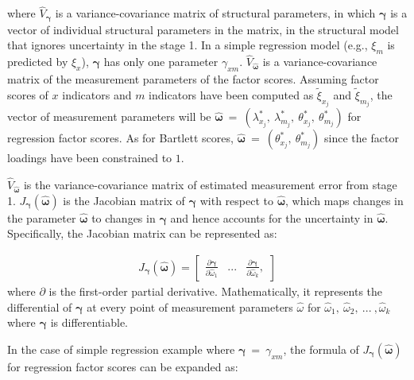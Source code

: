 \documentclass[
  11pt,
  man]{apa6}
\begin{document}
where \(\hat{V}_{\boldsymbol{\gamma}}\) is a variance-covariance matrix of structural parameters, in which \(\boldsymbol{\gamma}\) is a vector of individual structural parameters in the matrix, in the structural model that ignores uncertainty in the stage 1. In a simple regression model (e.g., \(\xi_{m}\) is predicted by \(\xi_{x}\)), \(\boldsymbol{\gamma}\) has only one parameter \(\gamma_{xm}\). \(\hat{V}_{\boldsymbol{\hat{\omega}}}\) is a variance-covariance matrix of the measurement parameters of the factor scores. Assuming factor scores of \(x\) indicators and \(m\) indicators have been computed as \(\tilde{\xi}_{x_{j}}\) and \(\tilde{\xi}_{m_{j}}\), the vector of measurement parameters will be \(\boldsymbol{\hat{\omega}} \ = \ (\lambda_{x_{j}}^\text{*}, \ \lambda_{m_{j}}^\text{*}, \ \theta_{x_{j}}^\text{*}, \ \theta_{m_{j}}^\text{*})\) for regression factor scores. As for Bartlett scores, \(\boldsymbol{\hat{\omega}} \ = \ (\theta_{x_{j}}^\text{*}, \ \theta_{m_{j}}^\text{*})\) since the factor loadings have been constrained to \(1\).

\(\hat{V}_{\boldsymbol{\hat{\omega}}}\) is the variance-covariance matrix of estimated measurement error from stage 1. \(J_{\boldsymbol{\gamma}}(\boldsymbol{\hat{\omega}})\) is the Jacobian matrix of \(\boldsymbol{\gamma}\) with respect to \(\boldsymbol{\hat{\omega}}\), which maps changes in the parameter \(\boldsymbol{\hat{\omega}}\) to changes in \(\boldsymbol{\gamma}\) and hence accounts for the uncertainty in \(\boldsymbol{\hat{\omega}}\). Specifically, the Jacobian matrix can be represented as:

\begin{align}
J_{\boldsymbol{\gamma}}(\boldsymbol{\hat{\omega}}) = 
\begin{bmatrix}
\frac{\partial \boldsymbol{\gamma}}{\partial \hat{\omega}_{1}} &...& \frac{\partial \boldsymbol{\gamma}}{\partial \hat{\omega}_{k}},
\end{bmatrix}
\end{align}
where \(\partial\) is the first-order partial derivative. Mathematically, it represents the differential of \(\boldsymbol{\gamma}\) at every point of measurement parameters \(\hat{\omega}\) for \(\hat{\omega}_{1}, \ \hat{\omega}_{2}, \ ... \ ,\hat{\omega}_{k}\) where \(\boldsymbol{\gamma}\) is differentiable.

In the case of simple regression example where \(\boldsymbol{\gamma} \ = \ \gamma_{xm}\), the formula of \(J_{\boldsymbol{\gamma}}(\boldsymbol{\hat{\omega}})\) for regression factor scores can be expanded as:
\end{document}
